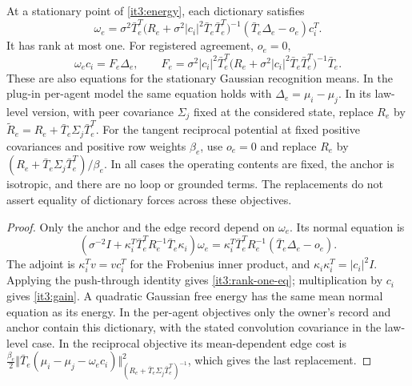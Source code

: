At a stationary point of \cref{it3:energy}, each dictionary satisfies
\begin{equation}
\omega_e=\sigma^2\bar T_e^T
\bigl(R_e+\sigma^2|c_i|^2\bar T_e\bar T_e^T\bigr)^{-1}
(\bar T_e\Delta_e-o_e)c_i^T.
\label{it3:rank-one-eq}
\end{equation}
It has rank at most one. For registered agreement, $o_e=0$,
\begin{equation}
\omega_ec_i=F_e\Delta_e,\qquad
F_e=\sigma^2|c_i|^2\bar T_e^T
\bigl(R_e+\sigma^2|c_i|^2\bar T_e\bar T_e^T\bigr)^{-1}\bar T_e.
\label{it3:gain}
\end{equation}
These are also equations for the stationary Gaussian recognition means. In the plug-in per-agent model the same equation holds with $\Delta_e=\mu_i-\mu_j$. In its law-level version, with peer covariance $\Sigma_j$ fixed at the considered state, replace $R_e$ by $\widetilde R_e=R_e+\bar T_e\Sigma_j\bar T_e^T$. For the tangent reciprocal potential at fixed positive covariances and positive row weights $\beta_e$, use $o_e=0$ and replace $R_e$ by $(R_e+\bar T_e\Sigma_j\bar T_e^T)/\beta_e$. In all cases the operating contents are fixed, the anchor is isotropic, and there are no loop or grounded terms. The replacements do not assert equality of dictionary forces across these objectives.
\begin{proof}
Only the anchor and the edge record depend on $\omega_e$. Its normal equation is
\begin{equation}
(\sigma^{-2}I+\kappa_i^T\bar T_e^TR_e^{-1}\bar T_e\kappa_i)\omega_e
=\kappa_i^T\bar T_e^TR_e^{-1}(\bar T_e\Delta_e-o_e).
\end{equation}
The adjoint is $\kappa_i^Tv=vc_i^T$ for the Frobenius inner product, and $\kappa_i\kappa_i^T=|c_i|^2I$. Applying the push-through identity gives \cref{it3:rank-one-eq}; multiplication by $c_i$ gives \cref{it3:gain}. A quadratic Gaussian free energy has the same mean normal equation as its energy. In the per-agent objectives only the owner's record and anchor contain this dictionary, with the stated convolution covariance in the law-level case. In the reciprocal objective its mean-dependent edge cost is $\frac{\beta_e}{2}\Vert\bar T_e(\mu_i-\mu_j-\omega_ec_i)\Vert_{(R_e+\bar T_e\Sigma_j\bar T_e^T)^{-1}}^2$, which gives the last replacement.
\end{proof}

